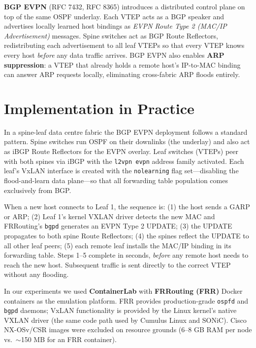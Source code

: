 \documentclass[10pt,twocolumn]{article}
\begin{document}
\textbf{BGP EVPN} (RFC 7432, RFC 8365) introduces a distributed control plane
on top of the same OSPF underlay.  Each VTEP acts as a BGP speaker and
advertises locally learned host bindings as \emph{EVPN Route Type 2
(MAC/IP Advertisement)} messages.  Spine switches act as BGP Route Reflectors,
redistributing each advertisement to all leaf VTEPs so that every VTEP knows
every host \emph{before} any data traffic arrives.  BGP EVPN also enables
\textbf{ARP suppression}: a VTEP that already holds a remote host's IP-to-MAC
binding can answer ARP requests locally, eliminating cross-fabric ARP floods
entirely.

\section{Implementation in Practice}

In a spine-leaf data centre fabric the BGP EVPN deployment follows a standard
pattern.  Spine switches run OSPF on their downlinks (the underlay) and also
act as iBGP Route Reflectors for the EVPN overlay.  Leaf switches (VTEPs) peer
with both spines via iBGP with the \texttt{l2vpn evpn} address family
activated.  Each leaf's VxLAN interface is created with the \texttt{nolearning}
flag set---disabling the flood-and-learn data plane---so that all forwarding
table population comes exclusively from BGP.

When a new host connects to Leaf 1, the sequence is: (1) the host sends a GARP
or ARP; (2) Leaf 1's kernel VXLAN driver detects the new MAC and FRRouting's
\texttt{bgpd} generates an EVPN Type 2 UPDATE; (3) the UPDATE propagates to
both spine Route Reflectors; (4) the spines reflect the UPDATE to all other
leaf peers; (5) each remote leaf installs the MAC/IP binding in its forwarding
table.  Steps 1--5 complete in seconds, \emph{before} any remote host needs to
reach the new host.  Subsequent traffic is sent directly to the correct VTEP
without any flooding.

In our experiments we used \textbf{ContainerLab} with \textbf{FRRouting (FRR)}
Docker containers as the emulation platform.  FRR provides production-grade
\texttt{ospfd} and \texttt{bgpd} daemons; VxLAN functionality is provided by
the Linux kernel's native VXLAN driver (the same code path used by Cumulus
Linux and SONiC).  Cisco NX-OSv/CSR images were excluded on resource grounds
(6--8 GB RAM per node vs.\ $\sim$150 MB for an FRR container).

\end{document}
